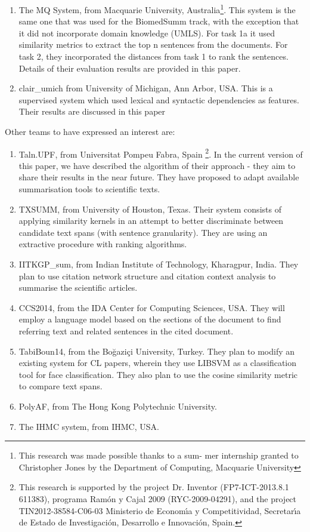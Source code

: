 \documentclass[11pt]{article}
\begin{document}
\begin{enumerate}
\item{The MQ System, from Macquarie University, Australia\footnote{This research was made possible thanks to a sum-
mer internship granted to Christopher Jones by the Department of Computing, Macquarie University}. This system is the same one that was used for the BiomedSumm track, with the exception that it did not incorporate domain knowledge (UMLS). For task 1a it used similarity metrics to extract the top n sentences from the documents. For task 2, they incorporated the distances from task 1 to rank the sentences. Details of their evaluation results are provided in this paper.}
\item{clair\_umich from University of Michigan, Ann Arbor, USA. This is a supervised system which used lexical and syntactic dependencies as features. Their results are discussed in this paper}
\end{enumerate}
Other teams to have expressed an interest are:
\begin{enumerate}
\item{Taln.UPF, from Universitat Pompeu Fabra, Spain \footnote{This research is supported by the project Dr. Inventor (FP7-ICT-2013.8.1 611383), programa Ram\'on y Cajal 2009 (RYC-2009-04291), and  the project TIN2012-38584-C06-03 Ministerio de Econom\'{\i}a y Competitividad, Secretar\'{\i}a de Estado de Investigaci\'on, Desarrollo e Innovaci\'on, Spain.}. In the current version of this paper, we have described the algorithm of their approach - they aim to share their results in the near future. They have proposed to adapt available summarisation tools to scientific texts.}
\item{TXSUMM, from University of Houston, Texas. Their system consists of applying similarity kernels in an attempt to better discriminate between candidate text spans (with sentence granularity). They are using an extractive procedure with ranking algorithms.}
\item{IITKGP\_sum, from Indian Institute of Technology, Kharagpur, India. They plan to use citation network structure and citation context analysis to summarise the scientific articles.}
\item{CCS2014, from the IDA Center for Computing Sciences, USA. They will employ a language model based on the sections of the document to find referring text and related sentences in the cited document.}
\item{TabiBoun14, from the Boğaziçi University, Turkey. They plan to modify an existing system for CL papers, wherein they use LIBSVM as a classification tool for face classification. They also plan to use the cosine similarity metric to compare text spans.}
\item{PolyAF, from The Hong Kong Polytechnic University.}
\item{The IHMC system, from IHMC, USA.}
\end{enumerate}
\end{document}
